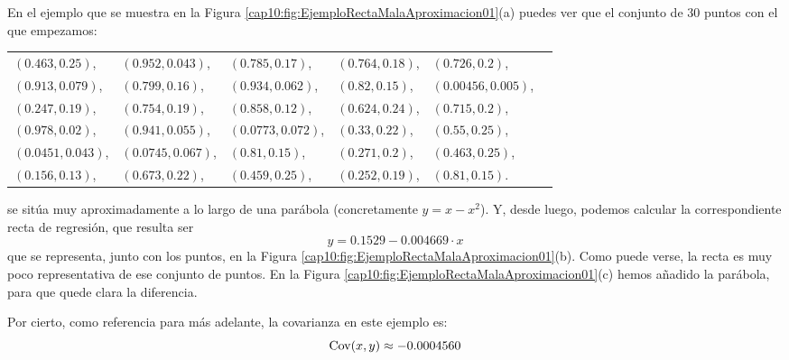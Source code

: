 \begin{ejemplo}\label{cap10:ejem:RectaMalaAproximacion01}
En el ejemplo que se muestra en la Figura \ref{cap10:fig:EjemploRectaMalaAproximacion01}(a) puedes ver que el conjunto de $30$ puntos con el que empezamos:
{\small
\begin{center}
\begin{tabular}{llllll}
    $(0.463, 0.25)$, &  $(0.952, 0.043)$,&  $(0.785, 0.17)$,&  $(0.764, 0.18)$,& $(0.726, 0.2)$,\\
    $(0.913, 0.079)$,&  $(0.799, 0.16)$, & $(0.934, 0.062)$,& $(0.82, 0.15)$,  & $(0.00456, 0.005)$,\\  $(0.247, 0.19)$,& $(0.754, 0.19)$,   & $(0.858, 0.12)$, & $(0.624, 0.24)$, &$(0.715, 0.2)$,\\
    $(0.978, 0.02)$,& $(0.941, 0.055)$,  & $(0.0773, 0.072)$,& $(0.33, 0.22)$, & $(0.55, 0.25)$,\\
    $(0.0451, 0.043)$,&  $(0.0745, 0.067)$,&  $(0.81, 0.15)$,& $(0.271, 0.2)$, & $(0.463, 0.25)$,\\  $(0.156, 0.13)$,&  $(0.673, 0.22)$, &  $(0.459, 0.25)$,  & $(0.252, 0.19)$,& $(0.81, 0.15)$.
\end{tabular}
\end{center}
}
 se sitúa muy aproximadamente a lo largo de una parábola (concretamente $y=x-x^2$). Y, desde luego, podemos calcular la correspondiente recta de regresión, que resulta ser \[y=0.1529-0.004669\cdot x\]
que se representa, junto con los puntos, en la Figura \ref{cap10:fig:EjemploRectaMalaAproximacion01}(b). Como puede verse, la recta es muy poco representativa de ese conjunto de puntos. En la Figura \ref{cap10:fig:EjemploRectaMalaAproximacion01}(c) hemos añadido la parábola, para que quede clara la diferencia.

Por cierto, como referencia para más adelante, la covarianza en este ejemplo es:
\[\mathrm{Cov}(x,y)\approx -0.0004560\]


\end{ejemplo}
